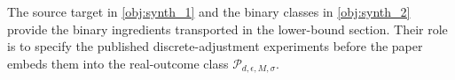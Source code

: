 The source target in \cref{obj:synth_1} and the binary classes in \cref{obj:synth_2} provide the binary ingredients transported in the lower-bound section. Their role is to specify the published discrete-adjustment experiments before the paper embeds them into the real-outcome class \(\mathcal P_{d,\epsilon,M,\sigma}\).
